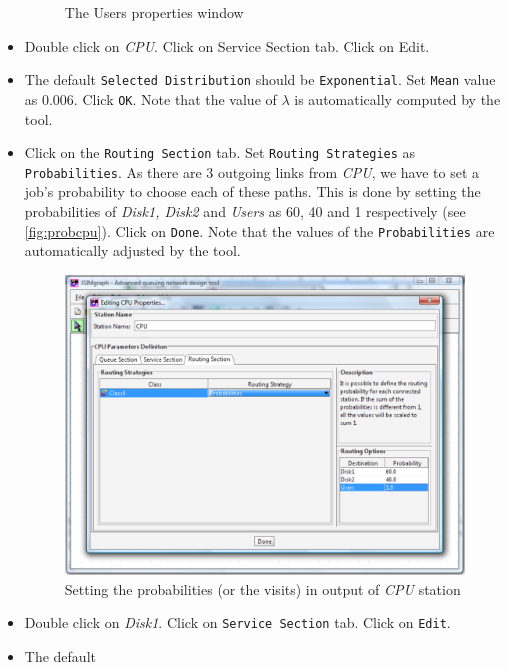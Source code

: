 \begin{itemize}
\begin{figure}[htb]
\begin{center}
    \end{center}
    \caption{The Users properties window}
    \label{fig:uspropwin}
\end{figure}
\item Double click on \emph{CPU}. Click on Service Section tab.
Click on Edit. \item The default \texttt{Selected Distribution}
should be \texttt{Exponential}. Set \texttt{Mean} value as 0.006.
Click \texttt{OK}. Note that the value of $\lambda$ is
automatically computed by the tool.

\item Click on the \texttt{Routing Section} tab. Set
\texttt{Routing Strategies} as \texttt{Probabilities}. As there
are 3 outgoing links from \emph{CPU}, we have to set a job's
probability to choose each of these paths. This is done by setting
the probabilities of \emph{Disk1, Disk2} and \emph{Users} as 60,
40 and 1 respectively (see \autoref{fig:probcpu}). Click on
\texttt{Done}. Note that the values of the \texttt{Probabilities}
are automatically adjusted by the tool.
\begin{figure}[htb]
    \begin{center}
        \includegraphics[scale=.5]{img/jsimg/12.6.eps}
    \end{center}
    \caption{Setting the probabilities (or the visits) in output
    of  \emph{CPU} station}
    \label{fig:probcpu}
\end{figure}
\item Double click on \emph{Disk1}. Click on \texttt{Service
Section} tab. Click on \texttt{Edit}. \item The default

\end{itemize}
